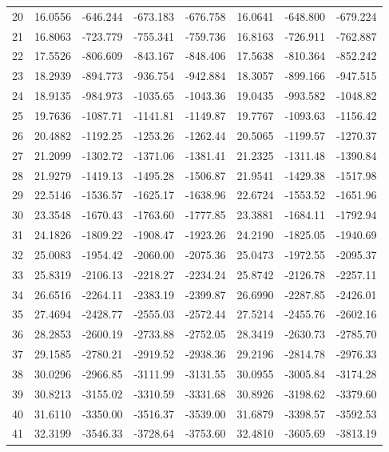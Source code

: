 \begin{table}[]
\begin{tabular}{c|cccc|ccc}
20	&	16.0556	&	-646.244	&	-673.183	&	-676.758	&	16.0641	&	-648.800	&	-679.224	\\
21	&	16.8063	&	-723.779	&	-755.341	&	-759.736	&	16.8163	&	-726.911	&	-762.887	\\
22	&	17.5526	&	-806.609	&	-843.167	&	-848.406	&	17.5638	&	-810.364	&	-852.242	\\
23	&	18.2939	&	-894.773	&	-936.754	&	-942.884	&	18.3057	&	-899.166	&	-947.515	\\
24	&	18.9135	&	-984.973	&	-1035.65	&	-1043.36	&	19.0435	&	-993.582	&	-1048.82	\\
25	&	19.7636	&	-1087.71	&	-1141.81	&	-1149.87	&	19.7767	&	-1093.63	&	-1156.42	\\
26	&	20.4882	&	-1192.25	&	-1253.26	&	-1262.44	&	20.5065	&	-1199.57	&	-1270.37	\\
27	&	21.2099	&	-1302.72	&	-1371.06	&	-1381.41	&	21.2325	&	-1311.48	&	-1390.84	\\
28	&	21.9279	&	-1419.13	&	-1495.28	&	-1506.87	&	21.9541	&	-1429.38	&	-1517.98	\\
29	&	22.5146	&	-1536.57	&	-1625.17	&	-1638.96	&	22.6724	&	-1553.52	&	-1651.96	\\
30	&	23.3548	&	-1670.43	&	-1763.60	&	-1777.85	&	23.3881	&	-1684.11	&	-1792.94	\\
31	&	24.1826	&	-1809.22	&	-1908.47	&	-1923.26	&	24.2190	&	-1825.05	&	-1940.69	\\
32	&	25.0083	&	-1954.42	&	-2060.00	&	-2075.36	&	25.0473	&	-1972.55	&	-2095.37	\\
33	&	25.8319	&	-2106.13	&	-2218.27	&	-2234.24	&	25.8742	&	-2126.78	&	-2257.11	\\
34	&	26.6516	&	-2264.11	&	-2383.19	&	-2399.87	&	26.6990	&	-2287.85	&	-2426.01	\\
35	&	27.4694	&	-2428.77	&	-2555.03	&	-2572.44	&	27.5214	&	-2455.76	&	-2602.16	\\
36	&	28.2853	&	-2600.19	&	-2733.88	&	-2752.05	&	28.3419	&	-2630.73	&	-2785.70	\\
37	&	29.1585	&	-2780.21	&	-2919.52	&	-2938.36	&	29.2196	&	-2814.78	&	-2976.33	\\
38	&	30.0296	&	-2966.85	&	-3111.99	&	-3131.55	&	30.0955	&	-3005.84	&	-3174.28	\\
39	&	30.8213	&	-3155.02	&	-3310.59	&	-3331.68	&	30.8926	&	-3198.62	&	-3379.60	\\
40	&	31.6110	&	-3350.00	&	-3516.37	&	-3539.00	&	31.6879	&	-3398.57	&	-3592.53	\\
41	&	32.3199	&	-3546.33	&	-3728.64	&	-3753.60	&	32.4810	&	-3605.69	&	-3813.19	\\

\end{tabular}
\end{table}
